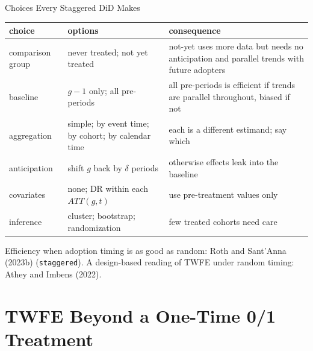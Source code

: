 \documentclass[aspectratio=169,11pt,xcolor=dvipsnames]{beamer}
\newcommand{\srct}[1]{#1}
\begin{document}
\begin{frame}{Choices Every Staggered DiD Makes}
\begin{center}\footnotesize
\renewcommand{\arraystretch}{1.12}
\begin{tabular}{@{}l>{\raggedright\arraybackslash}p{4.6cm}>{\raggedright\arraybackslash}p{5.3cm}@{}}
\toprule
choice & options & consequence \\
\midrule
comparison group & never treated; not yet treated & not-yet uses more data but needs no
  anticipation and parallel trends with future adopters \\
baseline & $g-1$ only; all pre-periods & all pre-periods is efficient if trends are
  parallel throughout, biased if not \\
aggregation & simple; by event time; by cohort; by calendar time & each is a different
  estimand; say which \\
anticipation & shift $g$ back by $\delta$ periods & otherwise effects leak into the baseline \\
covariates & none; DR within each $ATT(g,t)$ & use pre-treatment values only \\
inference & cluster; bootstrap; randomization & few treated cohorts need care \\
\bottomrule
\end{tabular}
\end{center}
\vskip3pt
{\footnotesize Efficiency when adoption timing is as good as random:
\srct{Roth and Sant'Anna (2023b)} (\texttt{staggered}). A design-based reading of
TWFE under random timing: \srct{Athey and Imbens (2022)}.}
\end{frame}


\section[Beyond 0/1]{TWFE Beyond a One-Time 0/1 Treatment}
\begin{frame}\sectionpage\end{frame}
\end{document}
